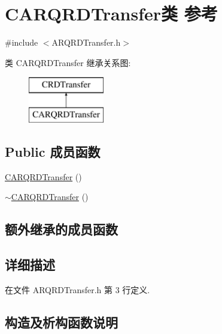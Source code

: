 \hypertarget{class_c_a_r_q_r_d_transfer}{}\section{C\+A\+R\+Q\+R\+D\+Transfer类 参考}
\label{class_c_a_r_q_r_d_transfer}


{\ttfamily \#include $<$A\+R\+Q\+R\+D\+Transfer.\+h$>$}

类 C\+A\+R\+Q\+R\+D\+Transfer 继承关系图\+:\begin{figure}[H]
\begin{center}
\leavevmode
\includegraphics[height=2.000000cm]{class_c_a_r_q_r_d_transfer}
\end{center}
\end{figure}
\subsection*{Public 成员函数}
\begin{DoxyCompactItemize}
\item 
\hyperlink{class_c_a_r_q_r_d_transfer_a8659f1d8b0d1549197a09a069ca202a0}{C\+A\+R\+Q\+R\+D\+Transfer} ()
\item 
\hyperlink{class_c_a_r_q_r_d_transfer_a27024e3ea60f67f88838a053a458f3d6}{$\sim$\+C\+A\+R\+Q\+R\+D\+Transfer} ()
\end{DoxyCompactItemize}
\subsection*{额外继承的成员函数}


\subsection{详细描述}


在文件 A\+R\+Q\+R\+D\+Transfer.\+h 第 3 行定义.



\subsection{构造及析构函数说明}
\mbox{\label{class_c_a_r_q_r_d_transfer_a8659f1d8b0d1549197a09a069ca202a0}} 
